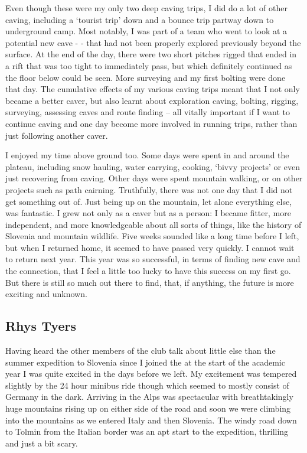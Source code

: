 Even though these were my only two deep caving trips, I did do a lot of other caving, including a ‘tourist trip’ down  and a bounce trip partway down to underground camp. Most notably, I was part of a team who went to look at a potential new cave -  - that had not been properly explored previously beyond the surface. At the end of the day, there were two short pitches rigged that ended in a rift that was too tight to immediately pass, but which definitely continued as the floor below could be seen. More surveying and my first bolting were done that day. The cumulative effects of my various caving trips meant that I not only became a better caver, but also learnt about exploration caving, bolting, rigging, surveying, assessing caves and route finding – all vitally important if I want to continue caving and one day become more involved in running trips, rather than just following another caver.

I enjoyed my time above ground too. Some days were spent in and around the plateau, including snow hauling, water carrying, cooking, ‘bivvy projects’ or even just recovering from caving. Other days were spent mountain walking, or on other projects such as path cairning. Truthfully, there was not one day that I did not get something out of. Just being up on the mountain, let alone everything else, was fantastic. I grew not only as a caver but as a person: I became fitter, more independent, and more knowledgeable about all sorts of things, like the history of Slovenia and mountain wildlife. Five weeks sounded like a long time before I left, but when I returned home, it seemed to have passed very quickly. I cannot wait to return next year. This year was so successful, in terms of finding new cave and the connection, that I feel a little too lucky to have this success on my first go. But there is still so much out there to find, that, if anything, the future is more exciting and unknown.

\subsection {Rhys Tyers}

Having heard the other members of the club talk about little else  than the summer expedition to Slovenia since I joined the at the start of the academic year I was quite excited in the days before we left. My excitement was tempered slightly by the 24 hour minibus ride though which seemed to mostly consist of Germany in the dark. Arriving in the Alps was spectacular with breathtakingly huge mountains rising up on either side of the road and soon we were climbing into the mountains as we entered Italy and then Slovenia. The windy road down to Tolmin from the Italian border was an apt start to the expedition, thrilling and just a bit scary.

